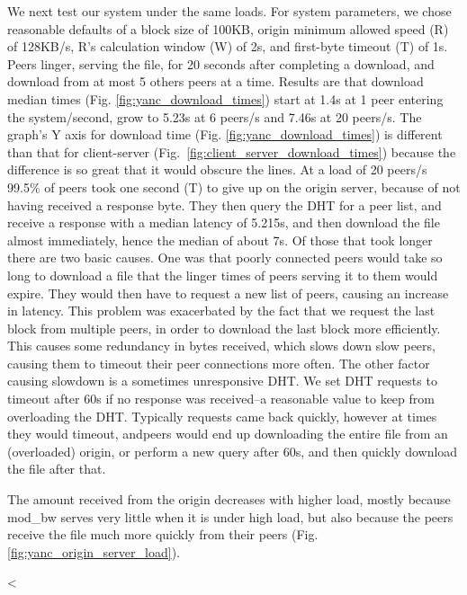 We next test our system under the same loads.  For system parameters, we chose reasonable defaults of a block size of 100KB, origin minimum allowed speed (R) of 128KB/s, R's calculation window (W) of 2s, and first-byte timeout (T) of 1s.  Peers linger, serving the file, for 20 seconds after completing a download, and download from at most 5 others peers at a time.  Results are that download median times (Fig. \ref{fig:yanc_download_times}) start at 1.4s at 1 peer entering the system/second, grow to 5.23s at 6 peers/s and 7.46s at 20 peers/s.  The graph's Y axis for download time (Fig. \ref{fig:yanc_download_times}) is different than that for client-server (Fig.~\ref{fig:client_server_download_times}) because the difference is so great that it would obscure the lines.   At a load of 20 peers/s 99.5\% of peers took one second (T) to give up on the origin server, because of not having received a response byte.  They then query the DHT for a peer list, and receive a response with a median latency of 5.215s, and then download the file almost immediately, hence the median of about 7s.  Of those that took longer there are two basic causes.  One was that poorly connected peers would take so long to download a file that the linger times of peers serving it to them would expire.  They would then have to request a new list of peers, causing an increase in latency.  This problem was exacerbated by the fact that we request the last block from multiple peers, in order to download the last block more efficiently.  This causes some redundancy in bytes received, which slows down slow peers, causing them to timeout their peer connections more often.  The other factor causing slowdown is a sometimes unresponsive DHT.  We set DHT requests to timeout after 60s if no response was received--a reasonable value to keep from overloading the DHT.  Typically requests came back quickly, however at times they would timeout, andpeers would end up downloading the entire file from an (overloaded) origin, or perform a new query after 60s, and then quickly download the file after that.

The amount received from the origin decreases with higher load, mostly because mod\_bw serves very little when it is under high load, but also because the peers receive the file much more quickly from their peers (Fig. \ref{fig:yanc_origin_server_load}).

<%

